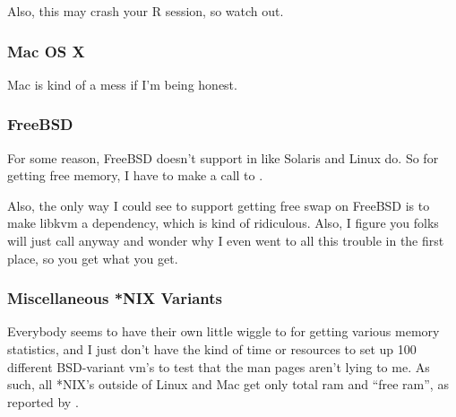 Also, this may crash your R session, so watch out.





\subsubsection{Mac OS X}

Mac is kind of a mess if I'm being honest.




\subsubsection{FreeBSD}

For some reason, FreeBSD doesn't support  in  like Solaris and Linux do.  So for getting free memory, I have to make a call to .

Also, the only way I could see to support getting free swap on FreeBSD is to make libkvm a dependency, 
which is kind of ridiculous.  Also, I figure you folks will just call  anyway and 
wonder why I even went to all this trouble in the first place, so you get what you get.



\subsubsection{Miscellaneous *NIX Variants}

Everybody seems to have their own little wiggle to  for getting various memory statistics, and I just don't have the kind of time or resources to set up 100 different BSD-variant vm's to test that the man pages aren't lying to me.  As such, all *NIX's outside of Linux and Mac get only total ram and ``free ram'', as reported by .
